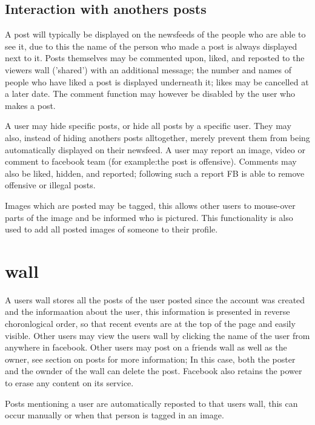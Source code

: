 \subsection{Interaction with anothers posts}
A post will typically be displayed on the newsfeeds of the people who are able
to see it, due to this the name of the person who made a post is always
displayed next to it. Posts themselves may be commented upon, liked, and
reposted to the viewers wall ('shared') with an additional message; the number
and names of people who have liked a post is displayed underneath it; likes may
be cancelled at a later date. The comment function may however be disabled by
the user who makes a post.

A user may hide specific posts, or hide all posts by a specific user. They may
also, instead of hiding anothers posts alltogether, merely prevent them from
being automatically displayed on their newsfeed.  A user may report an image, video or comment to
facebook team (for example:the post is offensive). Comments may also be liked,
hidden, and reported; following such a report FB is able to remove offensive or
illegal posts. 

Images which are posted may be tagged, this allows other users to mouse-over
parts of the image and be informed who is pictured. This functionality is also
used to add all posted images of someone to their profile.

\section{wall}
A users wall stores all the posts of the user posted since the account was
created and the informaation about the user, this information is presented in
reverse choronlogical order, so that recent events are at the top of the page
and easily visible. Other users may view the users wall by clicking the name of
the user from anywhere in facebook. Other users may post on a friends wall as
well as the owner, see section on posts for more information; In this case, both
the poster and the ownder of the wall can delete the post. Facebook also retains
the power to erase any content on its service.

Posts mentioning a user are automatically reposted to that users wall, this can
occur manually or when that person is tagged in an image.


